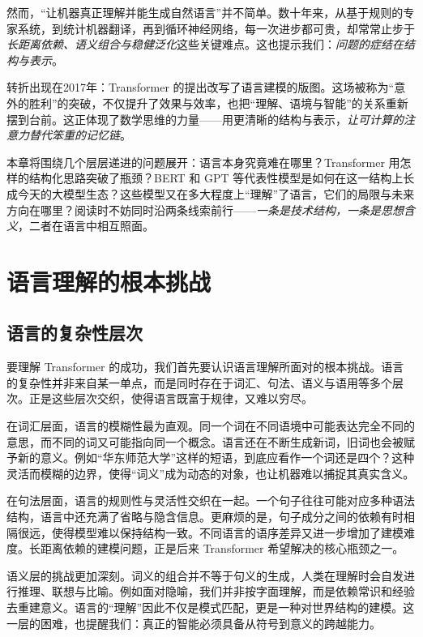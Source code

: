 然而，“让机器真正理解并能生成自然语言”并不简单。数十年来，从基于规则的专家系统，到统计机器翻译，再到循环神经网络，每一次进步都可贵，却常常止步于\emph{长距离依赖、语义组合与稳健泛化}这些关键难点。这也提示我们：\emph{问题的症结在结构与表示}。

转折出现在2017年：Transformer 的提出改写了语言建模的版图。这场被称为“意外的胜利”的突破，不仅提升了效果与效率，也把“理解、语境与智能”的关系重新摆到台前。这正体现了数学思维的力量——用更清晰的结构与表示，\emph{让可计算的注意力替代笨重的记忆链}。

本章将围绕几个层层递进的问题展开：语言本身究竟难在哪里？Transformer 用怎样的结构化思路突破了瓶颈？BERT 和 GPT 等代表性模型是如何在这一结构上长成今天的大模型生态？这些模型又在多大程度上“理解”了语言，它们的局限与未来方向在哪里？阅读时不妨同时沿两条线索前行——\emph{一条是技术结构，一条是思想含义}，二者在语言中相互照面。

\section{语言理解的根本挑战}

\subsection{语言的复杂性层次}

要理解 Transformer 的成功，我们首先要认识语言理解所面对的根本挑战。语言的复杂性并非来自某一单点，而是同时存在于词汇、句法、语义与语用等多个层次。正是这些层次交织，使得语言既富于规律，又难以穷尽。

在词汇层面，语言的模糊性最为直观。同一个词在不同语境中可能表达完全不同的意思，而不同的词又可能指向同一个概念。语言还在不断生成新词，旧词也会被赋予新的意义。例如“华东师范大学”这样的短语，到底应看作一个词还是四个？这种灵活而模糊的边界，使得“词义”成为动态的对象，也让机器难以捕捉其真实含义。

在句法层面，语言的规则性与灵活性交织在一起。一个句子往往可能对应多种语法结构，语言中还充满了省略与隐含信息。更麻烦的是，句子成分之间的依赖有时相隔很远，使得模型难以保持结构一致。不同语言的语序差异又进一步增加了建模难度。长距离依赖的建模问题，正是后来 Transformer 希望解决的核心瓶颈之一。

语义层的挑战更加深刻。词义的组合并不等于句义的生成，人类在理解时会自发进行推理、联想与比喻。例如面对隐喻，我们并非按字面理解，而是依赖常识和经验去重建意义。语言的“理解”因此不仅是模式匹配，更是一种对世界结构的建模。这一层的困难，也提醒我们：真正的智能必须具备从符号到意义的跨越能力。

